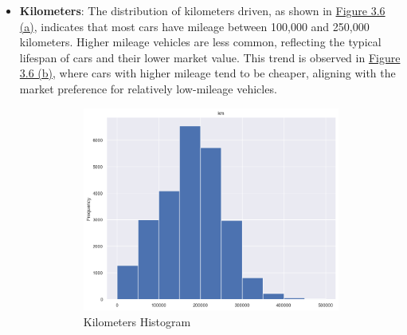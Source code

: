 \begin{itemize}
     \item \textbf{Kilometers}: The distribution of kilometers driven, as shown in \hyperref[fig:km-hist]{Figure 3.6 (a)}, indicates that most cars have mileage between 100,000 and 250,000 kilometers. Higher mileage vehicles are less common, reflecting the typical lifespan of cars and their lower market value. This trend is observed in \hyperref[fig:km-box]{Figure 3.6 (b)}, where cars with higher mileage tend to be cheaper, aligning with the market preference for relatively low-mileage vehicles.

     \begin{figure}[!h]
        \begin{subfigure}[b]{0.48\linewidth}
            \centering
            \includegraphics[width=\linewidth]{images/priceprediction/after_outliers/km.png}
            \caption{Kilometers Histogram}
            \label{fig:km-hist}
        \end{subfigure}
        \hfill
        \begin{subfigure}[b]{0.48\linewidth}
            \centering

\end{subfigure}
\end{figure}
\end{itemize}
